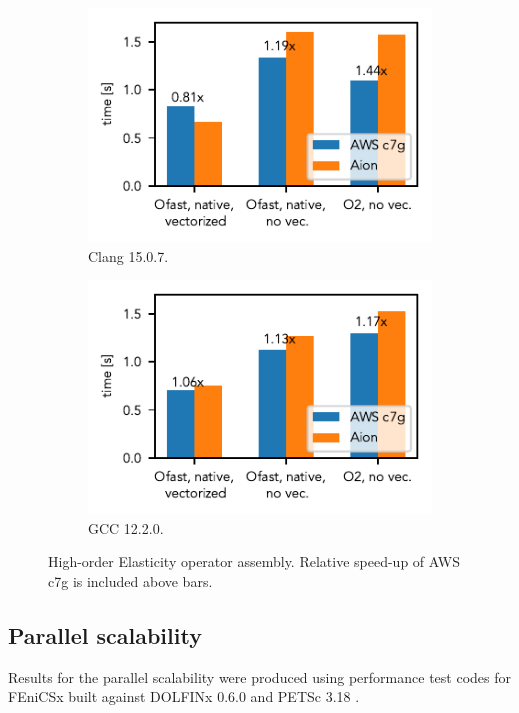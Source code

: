 \begin{figure}
    \begin{subfigure}{.5\textwidth}
        \centering
        \includegraphics{chapters/chp1/imgs/kernel_plots/local_operator_clang_deg6.pdf}
        \caption{Clang 15.0.7.}
        \label{fig:local-clang-deg6}
    \end{subfigure}%
    \begin{subfigure}{.5\textwidth}
        \centering
        \includegraphics{chapters/chp1/imgs/kernel_plots/local_operator_gcc_deg6.pdf}
        \caption{GCC 12.2.0.}
        \label{fig:local-gcc-deg6}
    \end{subfigure}
    \caption{High-order Elasticity operator assembly. Relative speed-up of AWS
    c7g is included above bars.}
    \label{fig:local-deg6}
\end{figure}

\subsection*{Parallel scalability}

Results for the parallel scalability were produced using performance test codes
for FEniCSx \cite{Wells2023} built against DOLFINx 0.6.0 and PETSc 3.18
\cite{petsc}.

